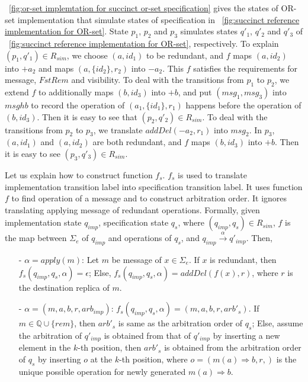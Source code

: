 {\color {red}\figurename~\ref{fig:or-set implemtation for succinct or-set specification} gives the states of OR-set implementation that simulate states of specification in \figurename~\ref{fig:succinct reference implementation for OR-set}. State $p_1$, $p_2$ and $p_3$ simulates states $q'_1$, $q'_2$ and $q'_3$ of \figurename~\ref{fig:succinct reference implementation for OR-set}, respectively. To explain $(p_1,q'_1) \in R_{\mathit{sim}}$, we choose $(a,\mathit{id}_1)$ to be redundant, and $f$ maps $(a,\mathit{id}_2)$ into $+a_2$ and maps $(a,\{ \mathit{id}_2 \},r_2)$ into $-a_2$. This $f$ satisfies the requirements for message, $\mathit{FstRem}$ and visibility. To deal with the transitions from $p_1$ to $p_2$, we extend $f$ to additionally maps $(b,\mathit{id}_3)$ into $+b$, and put $(\mathit{msg}_1,\mathit{msg}_3)$ into $\mathit{msghb}$ to record the operation of $(a_1,\{ \mathit{id}_1 \},r_1)$ happens before the operation of $(b,\mathit{id}_3)$. Then it is easy to see that $(p_2,q'_2) \in R_{\mathit{sim}}$. To deal with the transitions from $p_2$ to $p_3$, we translate $\mathit{addDel}(-a_2,r_1)$ into $\mathit{msg}_2$. In $p_3$, $(a,\mathit{id}_1)$ and $(a,\mathit{id}_2)$ are both redundant, and $f$ maps $(b,\mathit{id}_3)$ into $+b$. Then it is easy to see $(p_3,q'_3) \in R_{\mathit{sim}}$.

Let us explain how to construct function $f_s$. $f_s$ is used to translate implementation transition label into specification transition label. It uses function $f$ to find operation of a message and to construct arbitration order. It ignores translating applying message of redundant operations. Formally, given implementation state $q_{\mathit{imp}}$, specification state $q_s$, where $(q_{\mathit{imp}},q_s) \in R_{\mathit{sim}}$, $f$ is the map between $\Sigma_e$ of $q_{\mathit{imp}}$ and operations of $q_s$, and $q_{\mathit{imp}} {\xrightarrow{\alpha}} q'_{\mathit{imp}}$. Then,

\begin{itemize}
\setlength{\itemsep}{0.5pt}
\item[-] $\alpha = apply(m)$: Let $m$ be message of $x \in \Sigma_e$. If $x$ is redundant, then $f_s(q_{\mathit{imp}},q_s,\alpha) = \epsilon$; Else, $f_s(q_{\mathit{imp}},q_s,\alpha) = addDel(f(x),r)$, where $r$ is the destination replica of $m$.

\item[-] $\alpha = (m,a,b,r,\mathit{arb}_{\mathit{imp}})$: $f_s(q_{\mathit{imp}},q_s,\alpha) = (m,a,b,r,\mathit{arb}'_s)$. If $m \in \mathbb{Q} \cup \{ \mathit{rem} \}$, then $\mathit{arb}'_s$ is same as the arbitration order of $q_s$; Else, assume the arbitration of $q'_{\mathit{imp}}$ is obtained from that of $q'_{\mathit{imp}}$ by inserting a new element in the $k$-th position, then $\mathit{arb}'_s$ is obtained from the arbitration order of $q_s$ by inserting $o$ at the $k$-th position, where $o=(m(a)\Rightarrow b,r,)$ is the unique possible operation for newly generated $m(a)\Rightarrow b$.
\end{itemize}

}
